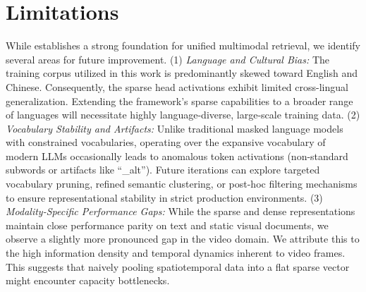 \section*{Limitations}

While \ours establishes a strong foundation for unified multimodal retrieval, we identify several areas for future improvement. 
(1) \emph{Language and Cultural Bias:} The training corpus utilized in this work is predominantly skewed toward English and Chinese. Consequently, the sparse head activations exhibit limited cross-lingual generalization. Extending the framework's sparse capabilities to a broader range of languages will necessitate highly language-diverse, large-scale training data. 
(2) \emph{Vocabulary Stability and Artifacts:} Unlike traditional masked language models with constrained vocabularies, operating over the expansive vocabulary of modern LLMs occasionally leads to anomalous token activations (\eg non-standard subwords or artifacts like ``\_alt''). Future iterations can explore targeted vocabulary pruning, refined semantic clustering, or post-hoc filtering mechanisms to ensure representational stability in strict production environments. 
(3) \emph{Modality-Specific Performance Gaps:} While the sparse and dense representations maintain close performance parity on text and static visual documents, we observe a slightly more pronounced gap in the video domain. We attribute this to the high information density and temporal dynamics inherent to video frames. This suggests that naively pooling spatiotemporal data into a flat sparse vector might encounter capacity bottlenecks. 